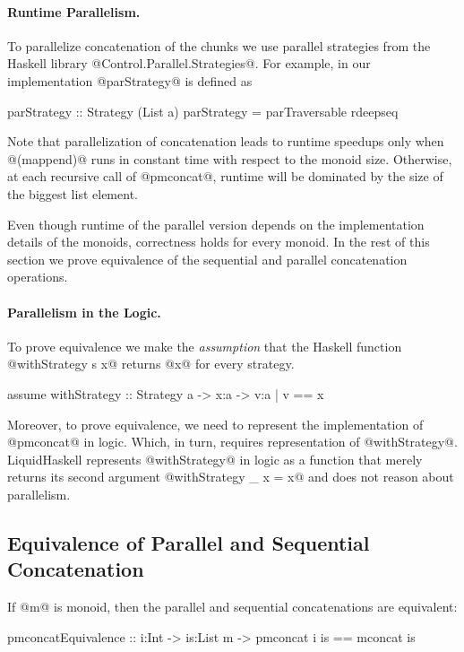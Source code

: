 \paragraph{Runtime Parallelism.}
To parallelize concatenation of the chunks we use parallel strategies 
from the Haskell library @Control.Parallel.Strategies@.
%
For example, in our implementation @parStrategy@ is defined as
\begin{code}
parStrategy :: Strategy (List a)
parStrategy = parTraversable rdeepseq
\end{code}

Note that parallelization of concatenation leads to runtime speedups
only when @(mappend)@ runs in constant time with respect to the monoid size. 
%
Otherwise, at each recursive call of @pmconcat@,
runtime will be dominated by the size of the biggest list element. 

Even though runtime of the parallel version depends on the implementation details 
of the monoids, correctness holds for every monoid. 
%
In the rest of this section we prove equivalence of the sequential and parallel concatenation operations. 


\paragraph{Parallelism in the Logic.}
To prove equivalence we make the \textit{assumption}
that the Haskell function @withStrategy s x@ 
returns @x@ for every strategy.
\begin{code}
assume withStrategy :: Strategy a -> x:a -> {v:a | v == x}
\end{code}
%
Moreover, to prove equivalence, we need to represent 
the implementation of @pmconcat@ in logic.
%
Which, in turn, requires representation of @withStrategy@. 
%
LiquidHaskell represents @withStrategy@ in logic as a function that merely returns
its second argument @withStrategy _ x = x@
and does not reason about parallelism. 

\subsection{Equivalence of Parallel and Sequential Concatenation}

\begin{theorem}\label{theorem:equivalence:concat}
If @m@ is monoid, then the parallel and sequential concatenations are equivalent:
\begin{code}
pmconcatEquivalence 
  :: i:Int -> is:List m -> { pmconcat i is == mconcat is }
\end{code}
\end{theorem}

